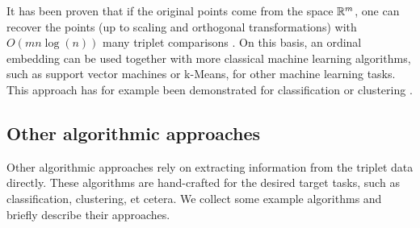 It has been proven that if the original points come from the space $\mathbb{R}^{m}$, one can recover the points (up to scaling and orthogonal transformations) with $O(mn\log(n))$ many triplet comparisons
\citep{jainFiniteSamplePrediction2016}. On this basis, an ordinal embedding can be used together with more classical machine learning algorithms, such as support vector machines or k-Means,
for other machine learning tasks. This approach has for example been demonstrated for classification \citep{tamuzAdaptivelyLearningCrowd2011, kleindessnerLensDepthFunction2017} or clustering \citep{kleindessnerLensDepthFunction2017}.

\subsection{Other algorithmic approaches}
Other algorithmic approaches rely on extracting information from the triplet data directly.
These algorithms are hand-crafted for the desired target tasks, such as classification, clustering, et cetera. We collect some example algorithms and briefly describe their approaches.


